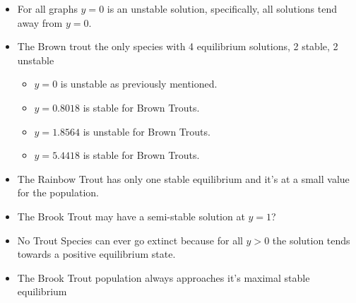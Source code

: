 \documentclass[letterpaper,12pt]{article}
\begin{document}
\begin{itemize}
    \item For all graphs \(y = 0\) is an unstable solution, specifically, all solutions tend away from \(y = 0\).
    \item The Brown trout the only species with 4 equilibrium solutions, 2 stable, 2 unstable 
        \begin{itemize}
            \item \(y = 0\) is unstable as previously mentioned.
            \item \(y = 0.8018\) is stable for Brown Trouts.
            \item \(y = 1.8564\) is unstable for Brown Trouts.
            \item \(y = 5.4418\) is stable for Brown Trouts.
        \end{itemize}
    \item The Rainbow Trout has only one stable equilibrium and it's at a small value for the population.
    \item The Brook Trout may have a semi-stable solution at \(y = 1\)?
    \item No Trout Species can ever go extinct because for all \(y > 0\) the solution tends towards a positive equilibrium state.
    \item The Brook Trout population always approaches it's maximal stable equilibrium 
\end{itemize}
\end{document}
